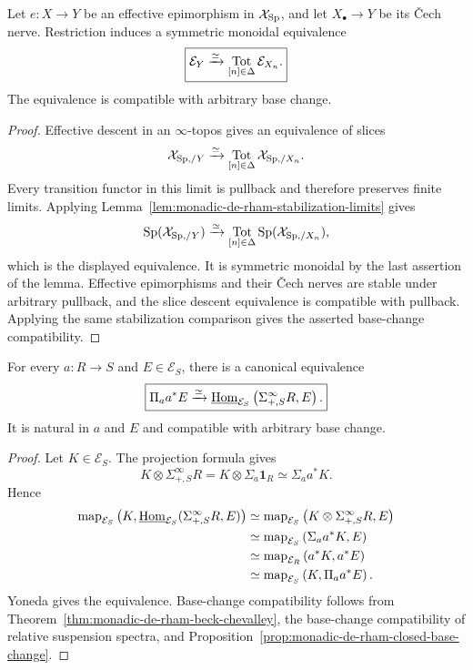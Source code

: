 \begin{theorem}
\label{thm:monadic-de-rham-effective-descent}
Let \(e:X\to Y\) be an effective epimorphism in \(\mathcal X_{\mathrm{Sp}}\), and let
\(X_\bullet\to Y\) be its \v{C}ech nerve.  Restriction induces a symmetric monoidal equivalence
\[
\boxed{
    \mathcal E_Y
    \xrightarrow{\simeq}
    \operatorname*{Tot}_{[n]\in\Delta}\mathcal E_{X_n}.
}
\]
The equivalence is compatible with arbitrary base change.
\end{theorem}

\begin{proof}
Effective descent in an \(\infty\)-topos gives an equivalence of slices
\[
    \mathcal X_{\mathrm{Sp},/Y}
    \xrightarrow{\simeq}
    \operatorname*{Tot}_{[n]\in\Delta}\mathcal X_{\mathrm{Sp},/X_n}.
\]
Every transition functor in this limit is pullback and therefore preserves finite limits.  Applying
Lemma~\ref{lem:monadic-de-rham-stabilization-limits} gives
\[
    \mathrm{Sp}(\mathcal X_{\mathrm{Sp},/Y})
    \xrightarrow{\simeq}
    \operatorname*{Tot}_{[n]\in\Delta}
    \mathrm{Sp}(\mathcal X_{\mathrm{Sp},/X_n}),
\]
which is the displayed equivalence.  It is symmetric monoidal by the last assertion of the lemma.
Effective epimorphisms and their \v{C}ech nerves are stable under arbitrary pullback, and the slice
descent equivalence is compatible with pullback.  Applying the same stabilization comparison gives
the asserted base-change compatibility.
\end{proof}

\begin{proposition}
\label{prop:parameterized-function-spectrum-identity}
For every \(a:R\to S\) and \(E\in\mathcal E_S\), there is a canonical equivalence
\[
\boxed{
    \Pi_a a^*E
    \xrightarrow{\simeq}
    \underline{\operatorname{Hom}}_{\mathcal E_S}
    \left(
        \Sigma^\infty_{+,S}R,E
    \right).
}
\]
It is natural in \(a\) and \(E\) and compatible with arbitrary base change.
\end{proposition}

\begin{proof}
Let \(K\in\mathcal E_S\).  The projection formula gives
\[
    K\otimes\Sigma^\infty_{+,S}R
    =
    K\otimes \Sigma_a\mathbf 1_R
    \simeq
    \Sigma_a a^*K.
\]
Hence
\[
\begin{aligned}
    \operatorname{map}_{\mathcal E_S}
    \left(
        K,
        \underline{\operatorname{Hom}}_{\mathcal E_S}
        (\Sigma^\infty_{+,S}R,E)
    \right)
    &\simeq
    \operatorname{map}_{\mathcal E_S}
    \left(
        K\otimes\Sigma^\infty_{+,S}R,E
    \right)
    \\
    &\simeq
    \operatorname{map}_{\mathcal E_S}
    \left(
        \Sigma_a a^*K,E
    \right)
    \\
    &\simeq
    \operatorname{map}_{\mathcal E_R}
    \left(
        a^*K,a^*E
    \right)
    \\
    &\simeq
    \operatorname{map}_{\mathcal E_S}
    \left(
        K,\Pi_a a^*E
    \right).
\end{aligned}
\]
Yoneda gives the equivalence.  Base-change compatibility follows from
Theorem~\ref{thm:monadic-de-rham-beck-chevalley}, the base-change compatibility of relative
suspension spectra, and Proposition~\ref{prop:monadic-de-rham-closed-base-change}.
\end{proof}


